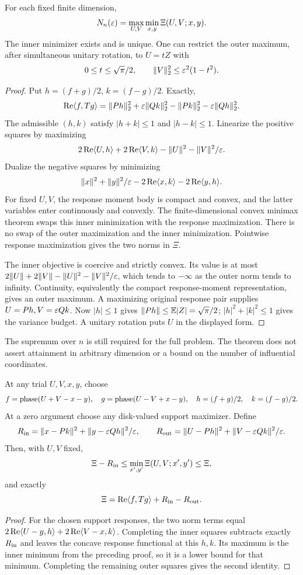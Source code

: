\begin{theorem}
\label{forest:thm-saddle}
For each fixed finite dimension,
\[
N_n(\varepsilon)=\max_{U,V}\min_{x,y}\Xi(U,V;x,y).
\]
The inner minimizer exists and is unique. One can restrict the outer
maximum, after simultaneous unitary rotation, to \(U=tZ\) with
\[
0\le t\le\sqrt\pi/2,\qquad
\|V\|_2^2\le\varepsilon^2(1-t^2).
\]
\end{theorem}
\begin{proof}
Put \(h=(f+g)/2\), \(k=(f-g)/2\). Exactly,
\[
\operatorname{Re}\langle f,Tg\rangle
=\|Ph\|_2^2+\varepsilon\|Qk\|_2^2-\|Pk\|_2^2-\varepsilon\|Qh\|_2^2.
\]
The admissible \((h,k)\) satisfy \(|h+k|\le1\) and \(|h-k|\le1\).
Linearize the positive squares by maximizing
\[
2\operatorname{Re}\langle U,h\rangle+2\operatorname{Re}\langle V,k\rangle
-\|U\|^2-\|V\|^2/\varepsilon.
\]
Dualize the negative squares by minimizing
\[
\|x\|^2+\|y\|^2/\varepsilon
-2\operatorname{Re}\langle x,k\rangle-2\operatorname{Re}\langle y,h\rangle.
\]
For fixed \(U,V\), the response moment body is compact and convex,
and the latter variables enter continuously and convexly. The
finite-dimensional convex minimax theorem swaps this inner
minimization with the response maximization. There is no swap of
the outer maximization and the inner minimization. Pointwise response
maximization gives the two norms in \(\Xi\).

The inner objective is coercive and strictly convex. Its value
is at most \(2\|U\|+2\|V\|-\|U\|^2-\|V\|^2/\varepsilon\), which tends
to \(-\infty\) as the outer norm tends to infinity. Continuity,
equivalently the compact response-moment representation, gives an
outer maximum. A maximizing original response pair supplies
\(U=Ph,V=\varepsilon Qk\).
Now \(|h|\le1\) gives \(\|Ph\|\le\mathbb E|Z|=\sqrt\pi/2\);
\(|h|^2+|k|^2\le1\) gives the variance budget.
A unitary rotation puts \(U\) in the displayed form.
\end{proof}

The supremum over \(n\) is still required for the full problem.
The theorem does not assert attainment in arbitrary dimension or
a bound on the number of influential coordinates.

\begin{proposition}
\label{forest:bracket}
At any trial \(U,V,x,y\), choose
\[
f=\operatorname{phase}(U+V-x-y),\quad
g=\operatorname{phase}(U-V+x-y),\quad h=(f+g)/2,\quad k=(f-g)/2.
\]
At a zero argument choose any disk-valued support maximizer. Define
\[
R_{\rm in}=\|x-Pk\|^2+\|y-\varepsilon Qh\|^2/\varepsilon,\qquad
R_{\rm out}=\|U-Ph\|^2+\|V-\varepsilon Qk\|^2/\varepsilon.
\]
Then, with \(U,V\) fixed,
\[
\Xi-R_{\rm in}\le\min_{x',y'}\Xi(U,V;x',y')\le\Xi,
\]
and exactly
\[
\Xi=\operatorname{Re}\langle f,Tg\rangle+R_{\rm in}-R_{\rm out}.
\]
\end{proposition}
\begin{proof}
For the chosen support responses,
the two norm terms equal
\(2\operatorname{Re}\langle U-y,h\rangle+2\operatorname{Re}\langle V-x,k\rangle\).
Completing the inner squares subtracts exactly \(R_{\rm in}\)
and leaves the concave response functional at this \(h,k\).
Its maximum is the inner minimum from the preceding proof,
so it is a lower bound for that minimum. Completing the remaining
outer squares gives the second identity.
\end{proof}

